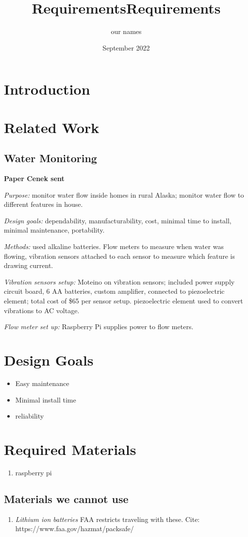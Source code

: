 \documentclass[12pt, letterpaper]{article}
\title{Requirements}
\author{our names}
\date{September 2022}
\begin{document}
\maketitle
\pagestyle{plain}

\title{Requirements}

\section{Introduction}

\section{Related Work}
\subsection{Water Monitoring}
\textbf{Paper Cenek sent}
%

\textit{Purpose:} monitor water flow inside homes in rural Alaska; monitor water flow to different features in house.
%

\textit{Design goals:} dependability, manufacturability, cost, minimal time to install, minimal maintenance, portability.
%

\textit{Methods:} used alkaline batteries. Flow meters to measure when water was flowing, vibration sensors attached to each
sensor to measure which feature is drawing current.
%

\textit{Vibration sensors setup:} Moteino on vibration sensors; included power supply circuit board, 6 AA batteries,
custom amplifier, connected to piezoelectric element; total cost of \$65 per sensor setup.
%
piezoelectric element used to convert vibrations to AC voltage.

\textit{Flow meter set up:} Raspberry Pi supplies power to flow meters.


\section{Design Goals}
\begin{itemize}
\item Easy maintenance
\item Minimal install time
\item reliability 
\end{itemize}


\section{Required Materials}
\begin{enumerate}
\item raspberry pi
\end{enumerate}

\subsection{Materials we cannot use}
\begin{enumerate}
\item \textit{Lithium ion batteries} FAA restricts traveling with these. Cite: https://www.faa.gov/hazmat/packsafe/
\end{enumerate}
\end{document}
